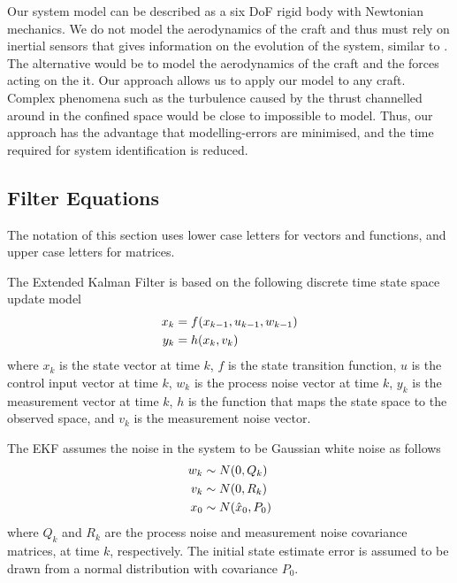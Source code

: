 \documentclass[]{article}
\begin{document}
{%

Our system model can be described as a six DoF rigid body with Newtonian mechanics.
We do not model the aerodynamics of the craft and thus must rely on inertial sensors that gives information on the evolution of the system, similar to  \cite{OpenPilotPaper}.
The alternative would be to model the aerodynamics of the craft and the forces acting on the it. Our approach allows us to apply our model to any craft.
Complex phenomena such as the turbulence caused by the thrust channelled around in the confined space would be close to impossible to model.
Thus, our approach has the advantage that modelling-errors are minimised, and the time required for system identification is reduced.

\subsection{Filter Equations} %
\label{sub:filter_equations}
The notation of this section uses lower case letters for vectors and functions, and upper case letters for matrices. 

The Extended Kalman Filter is based on the following discrete time state space update model
\begin{align}
	x_k &= f(x_{k-1}, u_{k-1}, w_{k-1}) \notag \\
	y_k &= h(x_k, v_k)
	\label{eqn:system}
\end{align}
where $x_k$ is the state vector at time $k$, $f$ is the state transition function, $u$ is the control input vector at time $k$, $w_k$ is the process noise vector at time $k$, $y_k$ is the measurement vector at time $k$, $h$ is the function that maps the state space to the observed space, and $v_k$ is the measurement noise vector.

The EKF assumes the noise in the system to be Gaussian white noise as follows
\begin{align}
	w_k &\sim N(0,Q_k) \notag \\
	v_k &\sim N(0,R_k) \notag \\
	x_0 &\sim N(\hat{x}_0,P_0)
	\label{eqn:noisedef}
\end{align}
where $Q_k$ and $R_k$ are the process noise and measurement noise covariance matrices, at time $k$, respectively. The initial state estimate error is assumed to be drawn from a normal distribution with covariance $P_0$.

}
\end{document}
